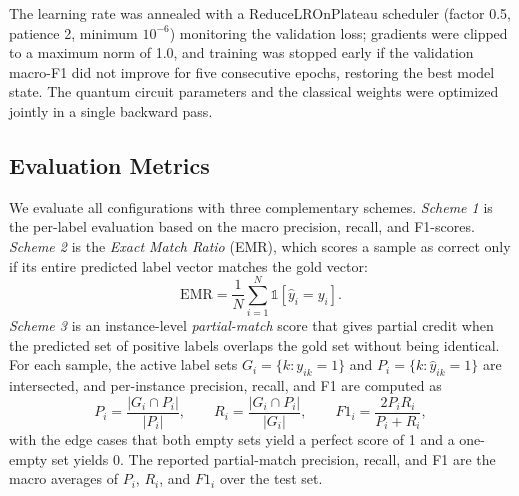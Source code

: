 \documentclass[runningheads]{llncs}
\begin{document}
The learning rate was annealed with a ReduceLROnPlateau scheduler (factor 0.5, patience 2, minimum $10^{-6}$) monitoring the validation loss; gradients were clipped to a maximum norm of 1.0, and training was stopped early if the validation macro-F1 did not improve for five consecutive epochs, restoring the best model state. The quantum circuit parameters and the classical weights were optimized jointly in a single backward pass.

\subsection{Evaluation Metrics}\label{sec:metrics}
We evaluate all configurations with three complementary schemes. \emph{Scheme 1} is the per-label evaluation based on the macro precision, recall, and F1-scores. 
\emph{Scheme 2} is the \emph{Exact Match Ratio} (EMR), which scores a sample as correct only if its entire predicted label vector matches the gold vector:
\begin{equation}
\text{EMR} = \frac{1}{N} \sum_{i=1}^{N} \mathbb{1}\left[\hat{y}_i = y_i\right] .
\label{eq:emr}
\end{equation}
\emph{Scheme 3} is an instance-level \emph{partial-match} score that gives partial credit when the predicted set of positive labels overlaps the gold set without being identical. For each sample, the active label sets $G_i = \{k : y_{ik}=1\}$ and $P_i = \{k : \hat{y}_{ik}=1\}$ are intersected, and per-instance precision, recall, and F1 are computed as
\begin{equation}
P_i = \frac{|G_i \cap P_i|}{|P_i|}, \qquad R_i = \frac{|G_i \cap P_i|}{|G_i|}, \qquad F1_i = \frac{2 P_i R_i}{P_i + R_i},
\label{eq:partial}
\end{equation}
with the edge cases that both empty sets yield a perfect score of 1 and a one-empty set yields 0. The reported partial-match precision, recall, and F1 are the macro averages of $P_i$, $R_i$, and $F1_i$ over the test set.
\end{document}
